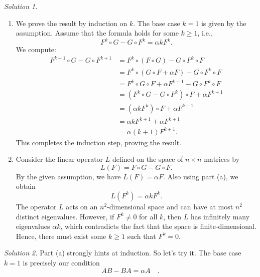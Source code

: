 \begin{solution}
    \textit{Solution 1.}
    \begin{enumerate}
        \item[(a)] We prove the result by induction on \( k \). The base case \( k = 1 \) is given by the assumption. Assume that the formula holds for some \( k \geq 1 \), i.e.,
            \[
                F^k \circ G - G \circ F^k = \alpha k F^k.
            \]
            We compute:
            \begin{align*}
                F^{k+1} \circ G - G \circ F^{k+1}
                &= F^k \circ(F \circ G) - G \circ F^k \circ F \\
                &= F^k \circ(G \circ F + \alpha F) - G \circ F^k\circ F \\
                &= F^k\circ G \circ F + \alpha F^{k+1} - G \circ F^{k}\circ F \\
                &= (F^k \circ G - G\circ F^k) \circ F + \alpha F^{k+1} \\
                &= (\alpha k F^k) \circ F + \alpha F^{k+1} \\
                &= \alpha k F^{k+1} + \alpha F^{k+1} \\
                &= \alpha (k+1) F^{k+1}.
            \end{align*}
            This completes the induction step, proving the result.

        \item[(b)] Consider the linear operator \( L \) defined on the space of \( n \times n \) matrices by
            \[
                L\left(F\right) = F \circ G - G \circ F.
            \]
            By the given assumption, we have \( L\left(F\right) = \alpha F \). Also using part (a), we obtain
            \[
                L\left(F^k\right) = \alpha k F^k.
            \]
            The operator \( L \) acts on an \( n^2 \)-dimensional space and can have at most \( n^2 \) distinct eigenvalues. However, if \( F^k \neq 0 \) for all \( k \), then \( L \) has infinitely many eigenvalues \( \alpha k \), which contradicts the fact that the space is finite-dimensional. Hence, there must exist some \( k \geq 1 \) such that \( F^k = 0 \).
    \end{enumerate}

    \textit{Solution 2.}
    Part (a) strongly hints at induction. So let's try it. The base case \( k = 1 \) is precisely our condition
    \begin{equation}
        \label{eq:p13-condition} AB - BA = \alpha A \quad .
    \end{equation}


\end{solution}
